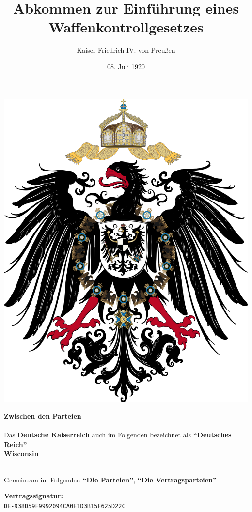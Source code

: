 \documentclass{article}
\title{Abkommen zur Einführung eines Waffenkontrollgesetzes}
\author{Kaiser Friedrich IV. von Preußen}
\date{08. Juli 1920}
\begin{document}
\maketitle
\begin{center}
    \includegraphics[scale=.15]{dr_wappen}
\end{center}
\begin{center}
    \textbf{Zwischen den Parteien\\}\textbf{\\}
    Das \textbf{Deutsche Kaiserreich} auch im Folgenden bezeichnet als \textbf{``Deutsches Reich''\\}
    \textbf{Wisconsin\\}\textbf{\\}

    Gemeinsam im Folgenden \textbf{``Die Parteien''}, \textbf{``Die Vertragsparteien''}
\end{center}
\newpage
{}
\vspace*{\fill}
\begin{Center}
\textbf{Vertragssignatur:\\}
\texttt{DE-938D59F9992094CA0E1D3B15F625D22C}
\vspace*{\fill}
\end{Center}
\newpage
\tableofcontents
\newpage
\end{document}

